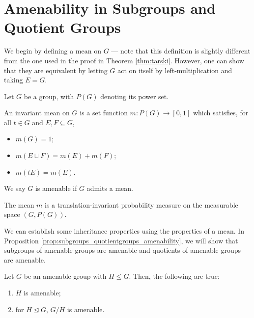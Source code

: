 \section{Amenability in Subgroups and Quotient Groups}\label{sec:amenability_subgroups_quotients}%
We begin by defining a mean on $G$ --- note that this definition is slightly different from the one used in the proof in Theorem \ref{thm:tarski}. However, one can show that they are equivalent by letting $G$ act on itself by left-multiplication and taking $E = G$.
\begin{definition}
  Let $G$ be a group, with $P(G)$ denoting its power set.\newline

  An invariant mean on $G$ is a set function $m\colon P(G)\rightarrow [0,1]$ which satisfies, for all $t\in G$ and $E,F\subseteq G$,
  \begin{itemize}
    \item $m(G) = 1$;
    \item $m\left(E\sqcup F\right) = m(E) + m(F)$;
    \item $m\left(tE\right) = m\left(E\right)$.
  \end{itemize}
  We say $G$ is amenable if $G$ admits a mean.\newline

  The mean $m$ is a translation-invariant probability measure on the measurable space $\left(G,P(G)\right)$.
\end{definition}
We can establish some inheritance properties using the properties of a mean. In Proposition \ref{prop:subgroups_quotientgroups_amenability}, we will show that subgroups of amenable groups are amenable and quotients of amenable groups are amenable.
\begin{proposition}\label{prop:subgroups_quotientgroups_amenability}
  Let $G$ be an amenable group with $H\leq G$. Then, the following are true:
  \begin{enumerate}[(1)]
    \item $H$ is amenable;
    \item for $H\trianglelefteq G$, $G/H$ is amenable.
  \end{enumerate}
\end{proposition}
